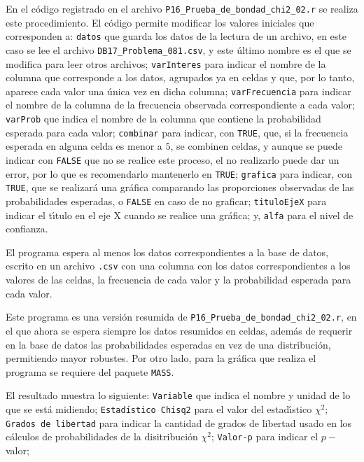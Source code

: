 \begin{solucion}
 En el c\'odigo registrado en el archivo
 \texttt{P16\_Prueba\_de\_bondad\_chi2\_02.r}
 se realiza este procedimiento.
 El c\'odigo permite modificar los valores iniciales que corresponden a:
 \texttt{datos} que guarda los datos de la lectura de un archivo, en este caso se lee el archivo
 \texttt{DB17\_Problema\_081.csv},
 y este \'ultimo nombre es el que se modifica para leer otros archivos;
 \texttt{varInteres} para indicar el nombre de la columna
 que corresponde a los datos, agrupados ya en celdas
 y que, por lo tanto, aparece cada valor una \'unica vez en dicha columna;
 \texttt{varFrecuencia} para indicar el nombre de la columna
 de la frecuencia observada correspondiente a cada valor;
 \texttt{varProb} que indica el nombre de la columna
 que contiene la probabilidad esperada para cada valor;
 \texttt{combinar} para indicar, con \texttt{TRUE}, que,
 si la frecuencia esperada en alguna celda es menor a $5$,
 se combinen celdas, y aunque se puede indicar con \texttt{FALSE}
 que no se realice este proceso, el no realizarlo puede dar un error,
 por lo que es recomendarlo mantenerlo en \texttt{TRUE};
 \texttt{grafica} para indicar, con \texttt{TRUE}, que se realizar\'a
 una gr\'afica comparando las proporciones observadas
 de las probabilidades esperadas, o \texttt{FALSE}
 en caso de no graficar;
 \texttt{tituloEjeX} para indicar el t\'{\i}tulo en el eje X
 cuando se realice una gr\'afica;
 y, \texttt{alfa} para el nivel de confianza.
 \par 
 El programa espera al menos los datos correspondientes a la base de datos,
 escrito en un archivo \texttt{.csv} con una columna con los datos 
 correspondientes a los valores de las celdas, la frecuencia de cada valor
 y la probabilidad esperada para cada valor.
 \par 
 Este programa es una versi\'on resumida
 de \texttt{P16\_Prueba\_de\_bondad\_chi2\_02.r},
 en el que ahora se espera siempre los datos resumidos en celdas,
 adem\'as de requerir en la base de datos las probabilidades
 esperadas en vez de una distribuci\'on, permitiendo mayor robustes.
 Por otro lado, para la gr\'afica que realiza el programa
 se requiere del paquete \texttt{MASS}.
 \par 
 El resultado muestra lo siguiente:
 \texttt{Variable} que indica el nombre y unidad de lo que se est\'a midiendo;
 \texttt{Estad\'{\i}stico Chisq2} para el valor del estad\'{\i}stico
 $\chi^2$;
 \texttt{Grados de libertad} para indicar la cantidad de grados de libertad
 usado en los c\'alculos de probabilidades de la disitribuci\'on $\chi^2$;
 \texttt{Valor-p} para indicar el $p-$valor;

\end{solucion}
